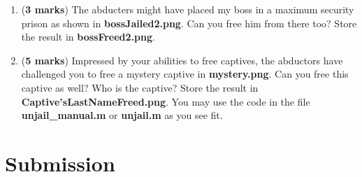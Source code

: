 \documentclass[11pt]{article} %
\begin{document}
\begin{enumerate}
\item (\textbf{3 marks}) The abducters might have placed my boss in a maximum security prison as shown in \textbf{bossJailed2.png}. Can you free him from there too? Store the result in \textbf{bossFreed2.png}.

\item (\textbf{5 marks}) Impressed by your abilities to free captives, the abductors have challenged you to free a mystery captive in \textbf{mystery.png}. Can you free this captive as well? Who is the captive? Store the result in \textbf{Captive'sLastNameFreed.png}. You may use the code in the file \textbf{unjail\_manual.m} or \textbf{unjail.m} as you see fit.
\end{enumerate}

\newpage
\section*{Submission}
\end{document}
